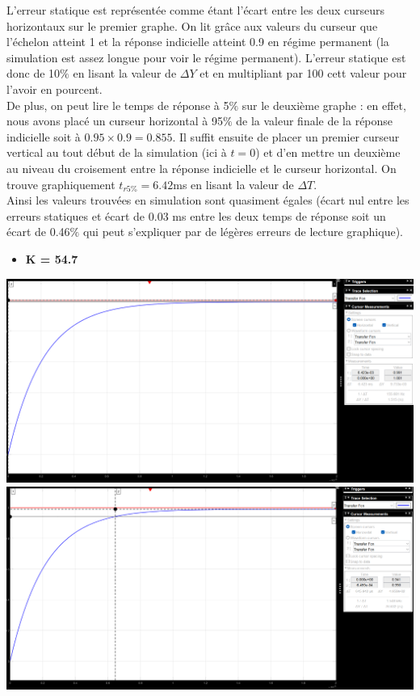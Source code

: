 \documentclass[12pt]{article}
\begin{document}
\normalsize L'erreur statique est représentée comme étant l'écart entre les deux curseurs horizontaux sur le premier graphe. On lit grâce aux valeurs du curseur que l'échelon atteint 1 et la réponse indicielle atteint 0.9 en régime permanent (la simulation est assez longue pour voir le régime permanent). L'erreur statique est donc de 10$\%$ en lisant la valeur de $\Delta Y$ et en multipliant par 100 cett valeur pour l'avoir en pourcent.
\\De plus, on peut lire le temps de réponse à 5$\%$ sur le deuxième graphe : en effet, nous avons placé un curseur horizontal à 95$\%$ de la valeur finale de la réponse indicielle soit à $0.95\times0.9 = 0.855$.
Il suffit ensuite de placer un premier curseur vertical au tout début de la simulation (ici à $t=0$) et d'en mettre un deuxième au niveau du croisement entre la réponse indicielle et le curseur horizontal. On trouve graphiquement $t_{r5\%} = 6.42$ms en lisant la valeur de $\Delta T$.
\\Ainsi les valeurs trouvées en simulation sont quasiment égales (écart nul entre les erreurs statiques et écart de 0.03 ms entre les deux temps de réponse soit un écart de 0.46$\%$ qui peut s'expliquer par de légères erreurs de lecture graphique).
\newpage
\begin{itemize}
    \item \bf \large K = 54.7
\end{itemize}
\begin{center}
    \includegraphics[width = 19 cm]{TP2 Simulink/Syst_1/Erreur_statique_syst_1_K=54.7.png}
    \includegraphics[width = 19 cm]{TP2 Simulink/Syst_1/tr5prct_syst_1_K=54.7.png}
\end{center}
\end{document}
